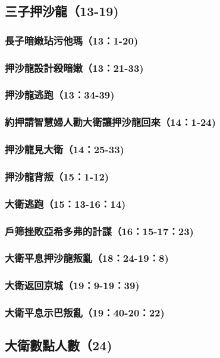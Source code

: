 \subsection{三子押沙龍（13-19)}
\subsubsection{長子暗嫩玷污他瑪（13：1-20)}
\subsubsection{押沙龍設計殺暗嫩（13：21-33)}
\subsubsection{押沙龍逃跑（13：34-39)}
\subsubsection{約押請智慧婦人勸大衛讓押沙龍回來（14：1-24)}
\subsubsection{押沙龍見大衛（14：25-33)}
\subsubsection{押沙龍背叛（15：1-12)}
\subsubsection{大衛逃跑（15：13-16：14)}
\subsubsection{戶筛挫敗亞希多弗的計謀（16：15-17：23)}
\subsubsection{大衛平息押沙龍叛亂（18：24-19：8)}

\subsubsection{大衛返回京城（19：9-19：39)}
\subsubsection{大衛平息示巴叛亂（19：40-20：22)}




\subsection{大衛數點人數（24)}
